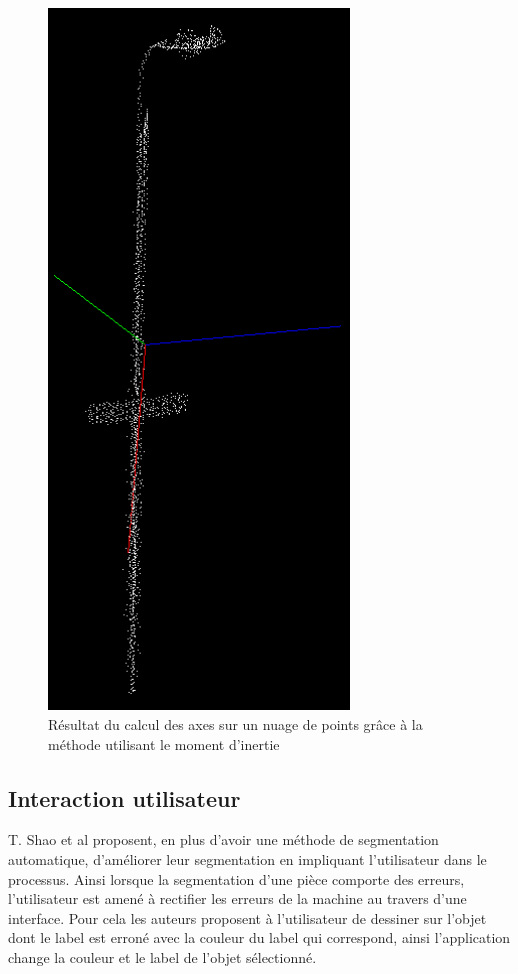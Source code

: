 \begin{figure}[!ht]
  \begin{center}
    \includegraphics[angle=90,origin=c,width=8cm]{image/objectAxis.png}
    \caption{Résultat du calcul des axes sur un nuage de points grâce à la méthode utilisant le moment d'inertie}
  \end{center}
\end{figure}

\subsection{Interaction utilisateur}
T. Shao et al\cite{interactiveSeg} proposent, en plus d'avoir une méthode de segmentation automatique, d'améliorer leur 
segmentation en impliquant l'utilisateur dans le processus. Ainsi lorsque la segmentation d'une pièce comporte des erreurs, 
l'utilisateur est amené à rectifier les erreurs de la machine au travers d'une interface.
Pour cela les auteurs proposent à l'utilisateur de dessiner sur l'objet dont le label est erroné avec la couleur du label 
qui correspond, ainsi l'application change la couleur et le label de l'objet sélectionné.\\ 

